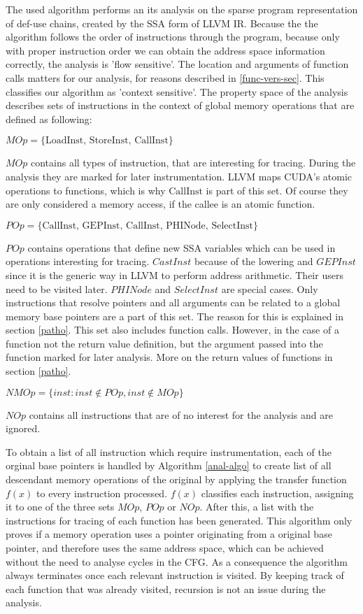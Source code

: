The used algorithm performs an its analysis on the sparse program representation of def-use chains, created by the SSA form of LLVM IR. Because the the algorithm follows the order of instructions through the program, because only with proper instruction order we can obtain the address space information correctly, the analysis is 'flow sensitive'. The location and arguments of function calls matters for our analysis, for reasons described in \ref{func-vers-sec}. This classifies our algorithm as 'context sensitive'.
The property space of the analysis describes sets of instructions in the context of global memory operations that are defined
as following:
\begin{defi}\label{mop}
	$	MOp = \{\textrm{LoadInst, StoreInst, CallInst}\} $
\end{defi}
$MOp$ contains all types of instruction, that are interesting for tracing. During the analysis they are marked for later instrumentation. LLVM maps CUDA's atomic operations to functions, which is why $\textrm{CallInst}$ is part of this set. Of course they are only considered a memory access, if the callee is an atomic function.
\begin{defi}\label{mopp}
	$   POp = \{\textrm{CallInst, GEPInst, CallInst, PHINode, SelectInst}\} $
\end{defi}
$POp$ contains operations that define new SSA variables which can be used in operations interesting for tracing. $CastInst$ because of the lowering  and $GEPInst$ since it is the generic way in LLVM
to perform address arithmetic. Their users need to be visited later. 
$PHINode$ and $SelectInst$ are special cases. Only instructions that resolve pointers and all arguments can be related to a global memory base pointers are a part of this set. The reason for
this is explained in section \ref{patho}.
This set also includes function calls. However, in the case of a function not the return value definition, but the argument passed into the function marked for later analysis. More on the return values of functions in section \ref{patho}.
\begin{defi}\label{nmop}
	$	NMOp = \{inst : inst \notin POp, inst \notin MOp\}$
\end{defi}
$NOp$ contains all instructions that are of no interest for the analysis and are ignored.

To obtain a list of all instruction which require instrumentation, each of the orginal base pointers is handled by Algorithm \ref{anal-algo} to create list of all descendant memory operations of the original by applying the transfer function $f(x)$ to every instruction processed. $f(x)$ classifies each instruction, assigning it to one of the three sets $MOp$, $POp$ or $NOp$. After this, a list with the instructions for tracing of each function has been generated. This algorithm only proves if a memory operation uses a pointer originating from a original base pointer, and therefore uses the same address space, which can be achieved without the need to analyse cycles in the CFG. As a consequence the algorithm always terminates once each relevant instruction is visited. By keeping track of each function that was already visited, recursion is not an issue during the analysis.


